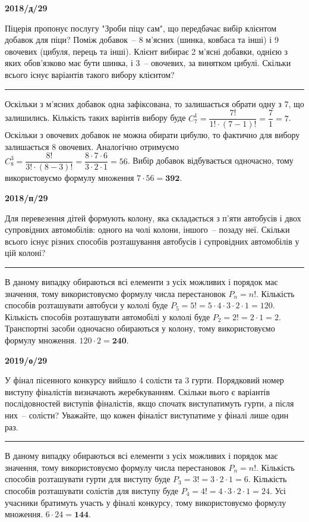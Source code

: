 \documentclass[12pt,a4paper]{article}  %
\begin{document}
\vspace{20pt}
\par\medskip \textbf{2018/д/29}\par
Піцерія пропонує послугу "Зроби піцу сам", що передбачає вибір клієнтом добавок для піци? Поміж добавок~-- 8 м'ясних (шинка, ковбаса та інші) і 9 овочевих (цибуля, перець та інші). Клієнт вибирає 2 м'ясні добавки, однією з яких обов'язково має бути шинка, і 3~-- овочевих, за винятком цибулі. Скільки всього існує варіантів такого вибору клієнтом?

\noindent\rule[0.5ex]{\linewidth}{1pt}
Оскільки з м'ясних добавок одна зафіксована, то залишається обрати одну з 7, що залишились. Кількість таких варінтів вибору буде $C_{7}^1=\dfrac{7!}{1!\cdot(7-1)!}=\dfrac{7}{1}=7$.
Оскільки з овочевих добавок не можна обирати цибулю, то фактично для вибору залишається 8 овочевих. Аналогічно отримуємо $C_{8}^3=\dfrac{8!}{3!\cdot(8-3)!}=\dfrac{8\cdot7\cdot6}{3\cdot2\cdot1}=56$.
Вибір добавок відбувається одночасно, тому використовуємо формулу множення $7\cdot56=\textbf{392}$.

\vspace{20pt}
\par\medskip \textbf{2018/п/29}\par
Для перевезення дітей формують колону, яка складається з п'яти автобусів і двох супровідних автомобілів: одного на чолі колони, іншого~-- позаду неї. Скільки всього існує різних способів розташування автобусів і супровідних автомобілів у цій колоні?

\noindent\rule[0.5ex]{\linewidth}{1pt}
В даному випадку обираються всі елементи з усіх можливих і порядок має значення, тому використовуємо формулу числа перестановок $P_n=n!$.
Кількість способів розташувати автобуси у кололі буде $P_5=5!=5\cdot4\cdot3\cdot2\cdot1=120$. Кількість способів розташувати автомобілі у кололі буде $P_2=2!=2\cdot1=2$. Транспортні засоби одночасно обираються у колону, тому використовуємо формулу множення. $120\cdot2=\textbf{240}$.

\vspace{20pt}
\par\medskip \textbf{2019/о/29}\par
У фінал пісенного конкурсу вийшло 4 солісти та 3 гурти. Порядковий номер виступу фіналістів визначають жеребкуванням. Скільки вього є варіантів послідовностей виступів фіналістів, якщо спочатк виступатимуть гурти, а після них~-- солісти?
Уважайте, що кожен фіналіст виступатиме у фіналі лише один раз.

\noindent\rule[0.5ex]{\linewidth}{1pt}
В даному випадку обираються всі елементи з усіх можливих і порядок має значення, тому використовуємо формулу числа перестановок $P_n=n!$.
Кількість способів розташувати гурти для виступу буде $P_3=3!=3\cdot2\cdot1=6$. Кількість способів розташувати солістів для виступу буде $P_4=4!=4\cdot3\cdot2\cdot1=24$. Усі учасники братимуть участь у фіналі конкурсу, тому використовуємо формулу множення. $6\cdot24=\textbf{144}$.
\end{document}
